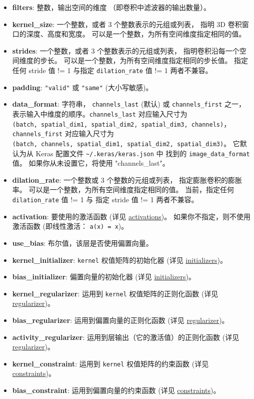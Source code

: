 \begin{itemize}
\tightlist
\item
  \textbf{filters}: 整数，输出空间的维度 （即卷积中滤波器的输出数量）。
\item
  \textbf{kernel\_size}: 一个整数，或者 3 个整数表示的元组或列表， 指明
  3D 卷积窗口的深度、高度和宽度。
  可以是一个整数，为所有空间维度指定相同的值。
\item
  \textbf{strides}: 一个整数，或者 3 个整数表示的元组或列表，
  指明卷积沿每一个空间维度的步长。
  可以是一个整数，为所有空间维度指定相同的步长值。 指定任何 stride 值 !=
  1 与指定 \texttt{dilation\_rate} 值 != 1 两者不兼容。
\item
  \textbf{padding}: \texttt{"valid"} 或 \texttt{"same"} (大小写敏感)。
\item
  \textbf{data\_format}: 字符串， \texttt{channels\_last} (默认) 或
  \texttt{channels\_first} 之一，
  表示输入中维度的顺序。\texttt{channels\_last} 对应输入尺寸为
  \texttt{(batch,\ spatial\_dim1,\ spatial\_dim2,\ spatial\_dim3,\ channels)}，
  \texttt{channels\_first} 对应输入尺寸为
  \texttt{(batch,\ channels,\ spatial\_dim1,\ spatial\_dim2,\ spatial\_dim3)}。
  它默认为从 Keras 配置文件 \texttt{\textasciitilde{}/.keras/keras.json}
  中 找到的 \texttt{image\_data\_format} 值。 如果你从未设置它，将使用
  "channels\_last"。
\item
  \textbf{dilation\_rate}: 一个整数或 3 个整数的元组或列表，
  指定膨胀卷积的膨胀率。 可以是一个整数，为所有空间维度指定相同的值。
  当前，指定任何 \texttt{dilation\_rate} 值 != 1 与 指定 stride 值 != 1
  两者不兼容。
\item
  \textbf{activation}: 要使用的激活函数 (详见
  \hyperref[activations]{activations})。
  如果你不指定，则不使用激活函数 (即线性激活： \texttt{a(x)\ =\ x})。
\item
  \textbf{use\_bias}: 布尔值，该层是否使用偏置向量。
\item
  \textbf{kernel\_initializer}: \texttt{kernel} 权值矩阵的初始化器 (详见
  \hyperref[initializers]{initializers})。
\item
  \textbf{bias\_initializer}: 偏置向量的初始化器 (详见
  \hyperref[initializers]{initializers})。
\item
  \textbf{kernel\_regularizer}: 运用到 \texttt{kernel}
  权值矩阵的正则化函数 (详见 \hyperref[regularizers]{regularizer})。
\item
  \textbf{bias\_regularizer}: 运用到偏置向量的正则化函数 (详见
  \hyperref[regularizers]{regularizer})。
\item
  \textbf{activity\_regularizer}: 运用到层输出（它的激活值）的正则化函数
  (详见 \hyperref[regularizers]{regularizer})。
\item
  \textbf{kernel\_constraint}: 运用到 \texttt{kernel} 权值矩阵的约束函数
  (详见 \hyperref[constraints]{constraints})。
\item
  \textbf{bias\_constraint}: 运用到偏置向量的约束函数 (详见
  \hyperref[constraints]{constraints})。
\end{itemize}

